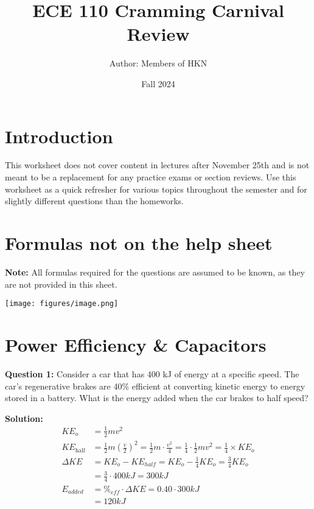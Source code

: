 \documentclass{article}
\begin{document}
\title{ECE 110 Cramming Carnival Review}
\author{Author: Members of HKN}
\date{Fall 2024}
\maketitle

\section*{Introduction}
This worksheet does not cover content in lectures after November 25th and is not meant to be a replacement for any practice exams or section reviews. Use this worksheet as a quick refresher for various topics throughout the semester and for slightly different questions than the homeworks.

\section*{Formulas not on the help sheet}
\textbf{Note:} All formulas required for the questions are assumed to be known, as they are not provided in this sheet.

\begin{center}
    \texttt{[image: figures/image.png]}
\end{center}
\newpage

\section*{Power Efficiency \& Capacitors}
\textbf{Question 1:} Consider a car that has 400 kJ of energy at a specific speed. The car's regenerative brakes are 40\% efficient at converting kinetic energy to energy stored in a battery. What is the energy added when the car brakes to half speed?

\textbf{Solution:}
\begin{align*}
    KE_{o} &= \frac{1}{2}mv^{2} \\
    KE_{\text{half}} &= \frac{1}{2} m {\left( \frac{v}{2} \right)}^{2}  = \frac{1}{2} m \cdot \frac{v^{2}}{4}  = \frac{1}{4} \cdot \frac{1}{2} m v^{2} =  \frac{1}{4} \times KE_{o} \\
    \Delta KE &= KE_{o} - KE_{half} = KE_{o} - \frac{1}{4}KE_{o} = \frac{3}{4}KE_{o} \\
    &= \frac{3}{4} \cdot 400kJ = 300 kJ \\
    E_{added} &= \%_{eff} \cdot \Delta KE = 0.40 \cdot 300kJ \\
    &= \boxed{120kJ}
\end{align*}
\end{document}
